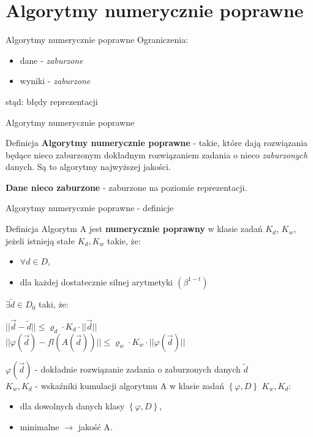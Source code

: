 \section{Algorytmy numerycznie poprawne}
\begin{frame}{Algorytmy numerycznie poprawne}
	Ograniczenia:
    \begin{itemize}
    	\item dane - {\it zaburzone}
    	\item wyniki - {\it zaburzone}
    \end{itemize}
    stąd: błędy reprezentacji
\end{frame}
\begin{frame}{Algorytmy numerycznie poprawne}
	\begin{block}{Definicja}
		{\bf Algorytmy numerycznie poprawne} - takie, które dają rozwiązania będące nieco zaburzonym dokładnym rozwiązaniem zadania o nieco {\it zaburzonych} danych. Są to algorytmy najwyższej jakości.
        
        {\bf Dane nieco zaburzone} - zaburzone na poziomie reprezentacji.
	\end{block}
\end{frame}
\begin{frame}{Algorytmy numerycznie poprawne - definicje}
	\begin{block}{Definicja}
    	Algorytm A jest {\bf numerycznie poprawny} w klasie zadań $K_d$, $K_w$, jeżeli istnieją stałe $K_d, K_w$ takie, że:
        \begin{itemize}
        	\item $\forall d \in D$,
            \item dla każdej dostatecznie silnej arytmetyki $\left( \beta^{1-t} \right)$
        \end{itemize}
        $\exists \tilde{d} \in D_0$ taki, że:
        
        {\centering
        	$|| \vec{d} - \tilde{d} || \le \varrho_d \cdot K_d \cdot || \vec{d} ||$ \\ \vspace{.1cm}
            $|| \varphi(\vec{d}) - fl(A(\vec{d})) || \le \varrho_w \cdot K_w \cdot || \varphi(\vec{d}) ||$ \\}

        $\varphi(\vec{d})$ - dokładnie rozwiązanie zadania o zaburzonych danych $\tilde{d}$ \\
        $K_w, K_d$ - wskaźniki kumulacji algorytmu A w klasie zadań $\left\{\varphi, D\right\}$
        $K_w, K_d$:
        \begin{itemize}
        	\item dla dowolnych danych klasy $\left\{ \varphi, D \right\}$,
            \item minimalne $\rightarrow$ jakość A.
        \end{itemize}
	\end{block}
\end{frame}
